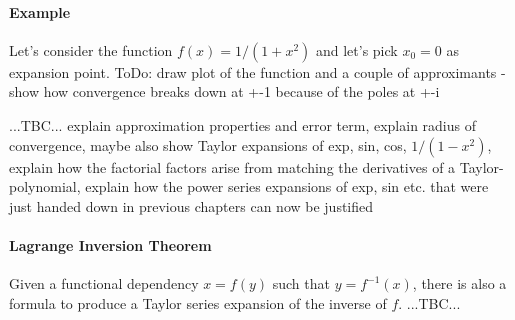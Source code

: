 

\paragraph{Example} Let's consider the function $f(x) = 1 / (1 + x^2)$ and let's pick $x_0 = 0$ as expansion point. ToDo: draw plot of the function and a couple of approximants - show how convergence breaks down at +-1 because of the poles at +-i

\medskip
...TBC... explain approximation properties and error term, explain radius of convergence, maybe also show Taylor expansions of exp, sin, cos, $1 / (1 - x^2)$, explain how the factorial factors arise from matching the derivatives of a Taylor-polynomial, explain how the power series expansions of exp, sin etc. that were just handed down in previous chapters can now be justified





\paragraph{Lagrange Inversion Theorem}
Given a functional dependency $x = f(y)$ such that $y = f^{-1}(x)$, there is also a formula to produce a Taylor series expansion of the inverse of $f$. ...TBC...

